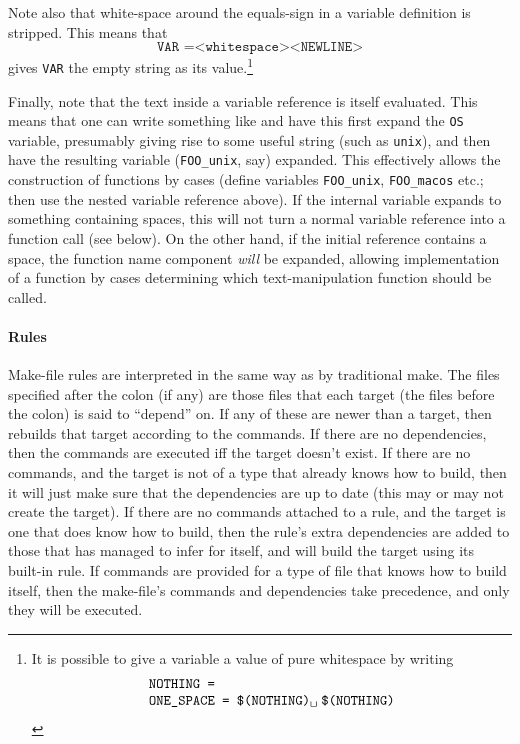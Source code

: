 Note also that white-space around the equals-sign in a variable
definition is stripped.  This means that
\[
\texttt{VAR =<whitespace><NEWLINE>}
\] gives \texttt{VAR} the empty string as its value.\footnote{It is
  possible to give a variable a value of pure whitespace by writing \[
\begin{array}{l}
\texttt{NOTHING =}\\
\texttt{ONE\_SPACE = \varref{NOTHING}\textvisiblespace\hspace{1mm}\varref{NOTHING}}\\
\end{array}\]}

Finally, note that the text inside a variable reference is itself
evaluated.  This means that one can write something like
 and have this first expand the \texttt{OS}
variable, presumably giving rise to some useful string (such as
\texttt{unix}), and then have the resulting variable
(\texttt{FOO\_unix}, say) expanded.  This effectively allows the
construction of functions by cases (define variables
\texttt{FOO\_unix}, \texttt{FOO\_macos} etc.; then use the nested
variable reference above).  If the internal variable expands to
something containing spaces, this will not turn a normal variable
reference into a function call (see below).  On the other hand,
if the initial reference contains a space, the function name component
\emph{will} be expanded, allowing implementation of a function by
cases determining which text-manipulation function should be called.

\paragraph{Rules}
Make-file rules are interpreted in the same way as by traditional
\textsf{make}.  The files specified after the colon (if any) are those
files that each target (the files before the colon) is said to
``depend'' on.  If any of these are newer than a target, then
\holmake{} rebuilds that target according to the commands.  If there
are no dependencies, then the commands are executed iff the
target doesn't exist.  If there are no commands, and the target is not
of a type that \holmake{} already knows how to build, then it will
just make sure that the dependencies are up to date (this may or
may not create the target).  If there are no commands attached to a
rule, and the target is one that \holmake{} does know how to build,
then the rule's extra dependencies are added to those that \holmake{}
has managed to infer for itself, and \holmake{} will build the target
using its built-in rule.  If commands are provided for a type of file
that \holmake{} knows how to build itself, then the make-file's
commands and dependencies take precedence, and only they will be
executed.

